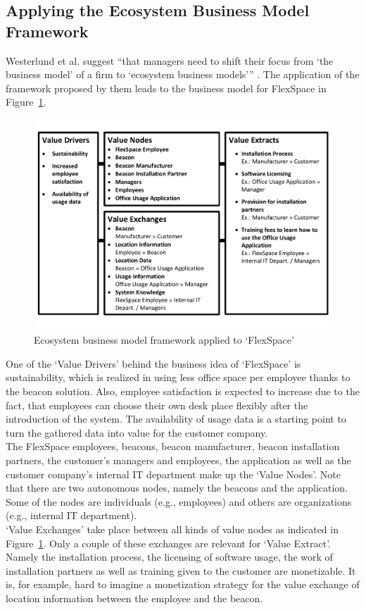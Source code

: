 	\subsection{Applying the Ecosystem Business Model Framework}
	\vspace{-1em}
		Westerlund et al. suggest ``that managers need to shift their focus from `the business model' of a firm to `ecosystem business models''' \cite{westerlund}. The application of the framework proposed by them leads to the business model for FlexSpace in Figure~\ref{fig:use_case_westerlund}.
		\begin{figure}[!htb]
		    \begin{center}
		    \includegraphics[scale=0.5]{Talk11/use_case_westerlund.pdf}
		    \end{center}
		    \caption{Ecosystem business model framework applied to `FlexSpace'}
		    \label{fig:use_case_westerlund}
		\end{figure}
		One of the `Value Drivers' behind the business idea of `FlexSpace' is sustainability, which is realized in using less office space per employee thanks to the beacon solution. Also, employee satisfaction is expected to increase due to the fact, that employees can choose their own desk place flexibly after the introduction of the system. The availability of usage data is a starting point to turn the gathered data into value for the customer company.\\
		The FlexSpace employees, beacons, beacon manufacturer, beacon installation partners, the customer's managers and employees, the application as well as the customer company's internal IT department make up the `Value Nodes'. Note that there are two autonomous nodes, namely the beacons and the application. Some of the nodes are individuals (e.g., employees) and others are organizations (e.g., internal IT department).\\
		`Value Exchanges' take place between all kinds of value nodes as indicated in Figure~\ref{fig:use_case_westerlund}. Only a couple of these exchanges are relevant for `Value Extract'. Namely the installation process, the licensing of software usage, the work of installation partners as well as training given to the customer are monetizable. It is, for example, hard to imagine a monetization strategy for the value exchange of location information between the employee and the beacon.
	\vspace{-1em}
